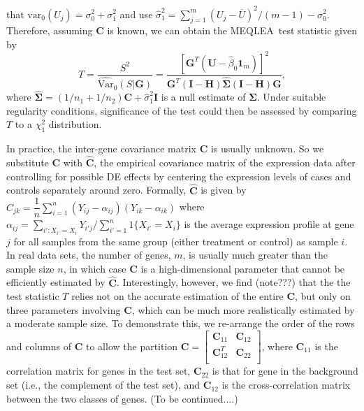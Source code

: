 \documentclass[a4,center,fleqn]{NAR}
\newcommand{\OurMethod}{MEQLEA}
\begin{document}
	that $\mbox{var}_{0}(U_j)=\sigma_0^2+\sigma_1^2$ and use
	$\hat\sigma_1^2=\sum_{j=1}^m(U_j-\overline{U})^2/(m-1)-\sigma_0^2$. Therefore, assuming $\bm C$ is
	known, we can obtain the \OurMethod~test statistic given by
	\begin{equation}
	T = \dfrac{S^2}{\widehat{\mbox{Var}}_{0}(S|\bm G)} = \dfrac{[\bm G^T(\bm U-\hat\beta_0\bm
		1_m)]^2}{\bm G^T(\bm I-\bm H)\hat{\bm\Sigma}(\bm I-\bm H)\bm G}, 
	\end{equation}
	where $\hat{\bm\Sigma}=(1/n_1+1/n_2)\bm C+\hat\sigma_1^2\bm I$ is a null estimate of $\bm \Sigma$.
	Under suitable regularity conditions, significance of the test could then be assessed by comparing
	$T$ to a $\chi^2_1$ distribution.
	
	In practice, the inter-gene covariance matrix $\bm C$ is usually unknown. So we substitute $\bm C$
	with $\hat {\bm C}$, the empirical covariance matrix of the expression data after controlling for
	possible DE effects by centering the expression levels of cases and controls separately around
	zero. Formally, $\hat {\bm C}$ is given by $\hat
	C_{jk}=\dfrac{1}{n}\sum_{i=1}^n(Y_{ij}-\alpha_{ij})(Y_{ik}-\alpha_{ik})$ where
	$\alpha_{ij}=\sum_{i':X_{i'}=X_{i}}Y_{i'j}/\sum_{i'=1}^n1\{X_{i'}=X_{i}\}$ is the average expression
	profile at gene $j$ for all samples from the same group (either treatment or control) as sample $i$.
	In real data sets, the number of genes, $m$, is usually much greater than the sample size $n$, in
	which case $\bm C$ is a high-dimensional parameter that cannot be efficiently estimated by $\hat
	{\bm C}$. Interestingly, however, we find (note???) that the the test statistic $T$ relies not on
	the accurate estimation of the entire $\bm C$, but only on three parameters involving $\bm C$, which
	can be much more realistically estimated by a moderate sample size. To demonstrate this, we
	re-arrange the order of the rows and columns of $\bm C$ to allow the partition $\bm
	C=\left[\begin{array}{cc}
	\bm C_{11} & \bm C_{12} \\       \bm C_{12}^T & \bm C_{22} \\      \end{array}\right] $,
	where $\bm C_{11}$ is the correlation matrix for genes in the test set, $\bm C_{22}$ is that for
	gene in the background set (i.e., the complement of the test set), and $\bm C_{12}$ is the
	cross-correlation matrix between the two classes of genes. (To be continued....)
	
	
	
\end{document}
